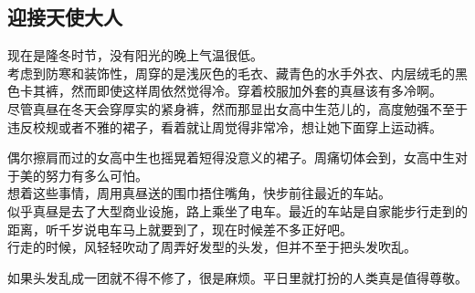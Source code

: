 \subsection{迎接天使大人}

现在是隆冬时节，没有阳光的晚上气温很低。\\

考虑到防寒和装饰性，周穿的是浅灰色的毛衣、藏青色的水手外衣、内层绒毛的黑色卡其裤，然而即使这样周依然觉得冷。穿着校服加外套的真昼该有多冷啊。\\

尽管真昼在冬天会穿厚实的紧身裤，然而那显出女高中生范儿的，高度勉强不至于违反校规或者不雅的裙子，看着就让周觉得非常冷，想让她下面穿上运动裤。

偶尔擦肩而过的女高中生也摇晃着短得没意义的裙子。周痛切体会到，女高中生对于美的努力有多么可怕。\\

想着这些事情，周用真昼送的围巾捂住嘴角，快步前往最近的车站。\\

似乎真昼是去了大型商业设施，路上乘坐了电车。最近的车站是自家能步行走到的距离，听千岁说电车马上就要到了，现在时候差不多正好吧。\\

行走的时候，风轻轻吹动了周弄好发型的头发，但并不至于把头发吹乱。

如果头发乱成一团就不得不修了，很是麻烦。平日里就打扮的人类真是值得尊敬。\\


